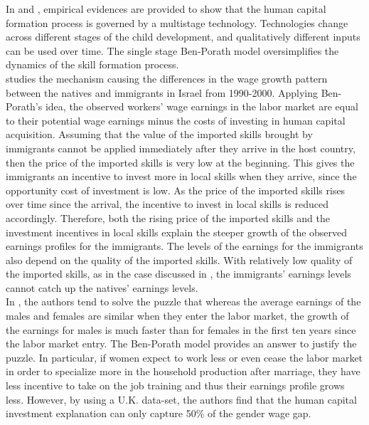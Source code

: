 \indent In \citet{cunha2007technology} and \citet{cunha2010estimating}, empirical evidences are provided to show that the human capital formation process is governed by a multistage technology. Technologies change across different stages of the child development, and qualitatively different inputs can be used over time. The single stage Ben-Porath model oversimplifies the dynamics of the skill formation process.\\
\indent \citet{eckstein2004wage} studies the mechanism causing the differences in the wage growth pattern between the natives and immigrants in Israel from 1990-2000. Applying Ben-Porath's idea, the observed workers' wage earnings in the labor market are equal to their potential wage earnings minus the costs of investing in human capital acquisition. Assuming that the value of the imported skills brought by immigrants cannot be applied immediately after they arrive in the host country, then the price of the imported skills is very low at the beginning. This gives the immigrants an incentive to invest more in local skills when they arrive, since the opportunity cost of investment is low. As the price of the imported skills rises over time since the arrival, the incentive to invest in local skills is reduced accordingly. Therefore, both the rising price of the imported skills and the investment incentives in local skills explain the steeper growth of the observed earnings profiles for the immigrants. The levels of the earnings for the immigrants also depend on the quality of the imported skills. With relatively low quality of the imported skills, as in the case discussed in \citet{eckstein2004wage}, the immigrants' earnings levels cannot catch up the natives' earnings levels.\\
\indent In \citet{manning2008gender}, the authors tend to solve the puzzle that whereas the average earnings of the males and females are similar when they enter the labor market, the growth of the earnings for males is much faster than for females in the first ten years since the labor market entry. The Ben-Porath model provides an answer to justify the puzzle. In particular, if women expect to work less or even cease the labor market in order to specialize more in the household production after marriage, they have less incentive to take on the job training and thus their earnings profile grows less. However, by using a U.K. data-set, the authors find that the human capital investment explanation can only capture 50\% of the gender wage gap.\\
